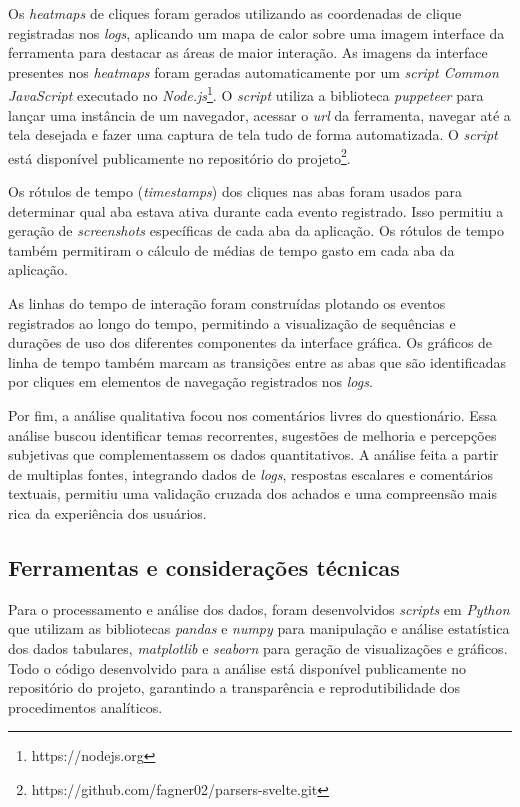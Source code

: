 Os \textit{heatmaps} de cliques foram gerados utilizando as coordenadas de clique registradas nos \textit{logs}, aplicando um mapa de calor sobre uma imagem interface da ferramenta para destacar as áreas de maior interação. As imagens da interface presentes nos \textit{heatmaps} foram geradas automaticamente por um \textit{script Common JavaScript} executado no \textit{Node.js}\footnote{https://nodejs.org}. O \textit{script} utiliza a biblioteca \textit{puppeteer} para lançar uma instância de um navegador, acessar o \textit{url} da ferramenta, navegar até a tela desejada e fazer uma captura de tela tudo de forma automatizada. O \textit{script} está disponível publicamente no repositório do projeto\footnote{https://github.com/fagner02/parsers-svelte.git}.

Os rótulos de tempo (\textit{timestamps}) dos cliques nas abas foram usados para determinar qual aba estava ativa durante cada evento registrado. Isso permitiu a geração de \textit{screenshots} específicas de cada aba da aplicação. Os rótulos de tempo também permitiram o cálculo de médias de tempo gasto em cada aba da aplicação.

As linhas do tempo de interação foram construídas plotando os eventos registrados ao longo do tempo, permitindo a visualização de sequências e durações de uso dos diferentes componentes da interface gráfica. Os gráficos de linha de tempo também marcam as transições entre as abas que são identificadas por cliques em elementos de navegação registrados nos \textit{logs}.

Por fim, a análise qualitativa focou nos comentários livres do questionário. Essa análise buscou identificar temas recorrentes, sugestões de melhoria e percepções subjetivas que complementassem os dados quantitativos. A análise feita a partir de multiplas fontes, integrando dados de \textit{logs}, respostas escalares e comentários textuais, permitiu uma validação cruzada dos achados e uma compreensão mais rica da experiência dos usuários.

\subsection{Ferramentas e considerações técnicas}

Para o processamento e análise dos dados, foram desenvolvidos \textit{scripts} em \textit{Python} que utilizam as bibliotecas \textit{pandas} e \textit{numpy} para manipulação e análise estatística dos dados tabulares, \textit{matplotlib} e \textit{seaborn} para geração de visualizações e gráficos. Todo o código desenvolvido para a análise está disponível publicamente no repositório do projeto, garantindo a transparência e reprodutibilidade dos procedimentos analíticos.

